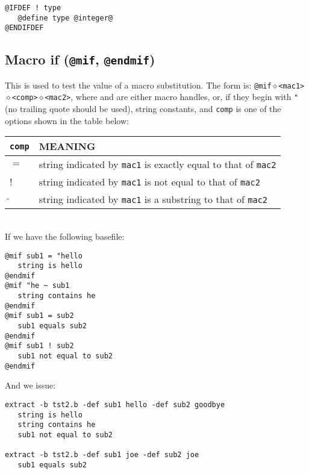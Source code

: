 \begin{verbatim}
@IFDEF ! type
   @define type @integer@
@ENDIFDEF
\end{verbatim}

\subsection{Macro if ({\tt @mif}, {\tt @endmif})}
This is used to test the value of a macro substitution.  The form is:
{\tt @mif$\diamond$<mac1>$\diamond$<comp>$\diamond$<mac2>}, where
{\tt <mac1>} and {\tt <mac2>} are either macro handles, or, if they
begin with {\tt "} (no trailing quote should be used), string constants,
and {\tt comp} is one of the options shown in the table below:\\
\begin{tabular}{|l|l|}\hline
{\tt comp} & MEANING\\\hline
$=$   & string indicated by {\tt mac1} is exactly equal to that of {\tt mac2}\\\hline
!    & string indicated by {\tt mac1} is not equal to that of {\tt mac2}\\\hline
$\tilde{}$ & string indicated by {\tt mac1} is a substring to that of {\tt mac2}\\\hline
\end{tabular}\\

If we have the following basefile:
\begin{verbatim}
@mif sub1 = "hello
   string is hello
@endmif
@mif "he ~ sub1
   string contains he
@endmif
@mif sub1 = sub2
   sub1 equals sub2
@endmif
@mif sub1 ! sub2
   sub1 not equal to sub2
@endmif
\end{verbatim}

And we issue:
\begin{verbatim}
extract -b tst2.b -def sub1 hello -def sub2 goodbye
   string is hello
   string contains he
   sub1 not equal to sub2

extract -b tst2.b -def sub1 joe -def sub2 joe
   sub1 equals sub2
\end{verbatim}


